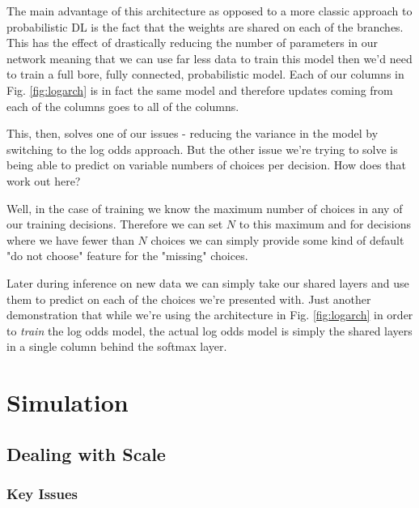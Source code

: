\documentclass[11pt]{article}
\begin{document}
The main advantage of this architecture as opposed to a more classic approach to probabilistic DL is the fact that the weights are shared on each of the branches. This has the effect of drastically reducing the number of parameters in our network meaning that we can use far less data to train this model then we'd need to train a full bore, fully connected, probabilistic model. Each of our columns in Fig. \ref{fig:logarch} is in fact the same model and therefore updates coming from each of the columns goes to all of the columns.

This, then, solves one of our issues - reducing the variance in the model by switching to the log odds approach. But the other issue we're trying to solve is being able to predict on variable numbers of choices per decision. How does that work out here?\newline

Well, in the case of training we know the maximum number of choices in any of our training decisions. Therefore we can set $N$ to this maximum and for decisions where we have fewer than $N$ choices we can simply provide some kind of default "do not choose" feature for the "missing" choices. 

Later during inference on new data we can simply take our shared layers and use them to predict on each of the choices we're presented with. Just another demonstration that while we're using the architecture in Fig. \ref{fig:logarch} in order to \textit{train} the log odds model, the actual log odds model is simply the shared layers in a single column behind the softmax layer. 





















\newpage
\section{Simulation}

\subsection{Dealing with Scale}

\subsubsection{Key Issues}
\end{document}
